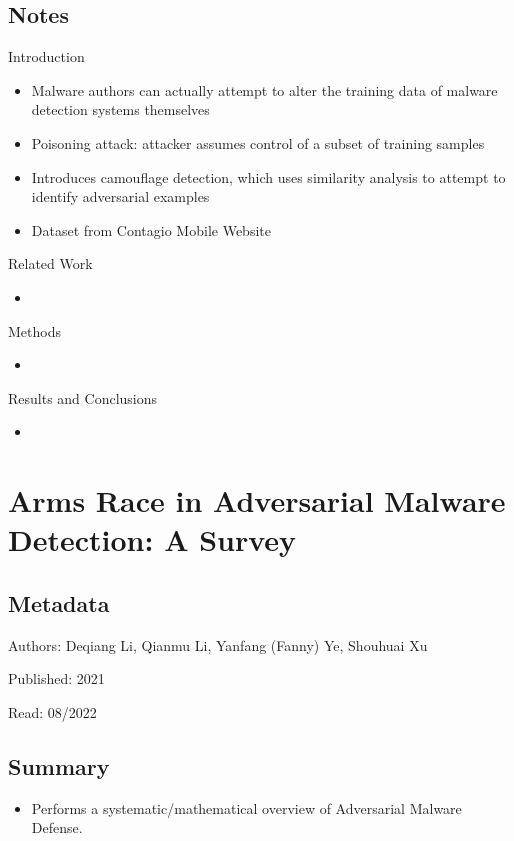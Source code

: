 \documentclass{article}
\begin{document}
\subsection*{Notes}

Introduction
\begin{itemize}
\item Malware authors can actually attempt to alter the training data of malware detection systems themselves
\item Poisoning attack: attacker assumes control of a subset of training samples
\item Introduces camouflage detection, which uses similarity analysis to attempt to identify adversarial examples
\item Dataset from Contagio Mobile Website
\end{itemize}
Related Work
\begin{itemize}
\item
\end{itemize}
Methods
\begin{itemize}
\item
\end{itemize}
Results and Conclusions
\begin{itemize}
\item
\end{itemize}
\pagebreak


\section*{Arms Race in Adversarial Malware Detection: A Survey}

\subsection*{Metadata}

\noindent Authors: Deqiang Li, Qianmu Li, Yanfang (Fanny) Ye, Shouhuai Xu

\noindent Published: 2021

\noindent Read: 08/2022

\subsection*{Summary}
\begin{itemize}
\item Performs a systematic/mathematical overview of Adversarial Malware Defense.
\end{itemize}
\end{document}
